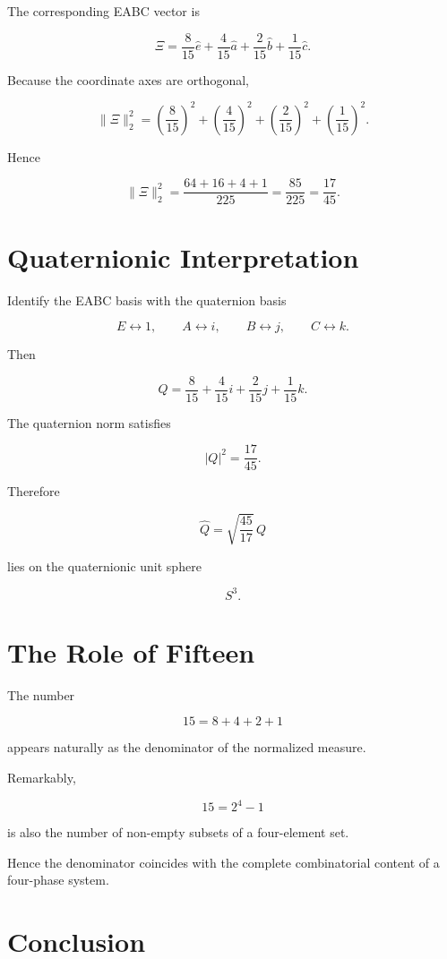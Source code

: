 \documentclass[11pt]{article}
\begin{document}
	The corresponding EABC vector is
	
	\[
	\Xi
	=
	\frac8{15}\hat e
	+
	\frac4{15}\hat a
	+
	\frac2{15}\hat b
	+
	\frac1{15}\hat c.
	\]
	
	Because the coordinate axes are orthogonal,
	
	\[
	\|\Xi\|_2^2
	=
	\left(\frac8{15}\right)^2
	+
	\left(\frac4{15}\right)^2
	+
	\left(\frac2{15}\right)^2
	+
	\left(\frac1{15}\right)^2.
	\]
	
	Hence
	
	\[
	\|\Xi\|_2^2
	=
	\frac{64+16+4+1}{225}
	=
	\frac{85}{225}
	=
	\frac{17}{45}.
	\]
	
	\section{Quaternionic Interpretation}
	
	Identify the EABC basis with the quaternion basis
	
	\[
	E\leftrightarrow1,
	\qquad
	A\leftrightarrow i,
	\qquad
	B\leftrightarrow j,
	\qquad
	C\leftrightarrow k.
	\]
	
	Then
	
	\[
	Q
	=
	\frac8{15}
	+
	\frac4{15}i
	+
	\frac2{15}j
	+
	\frac1{15}k.
	\]
	
	The quaternion norm satisfies
	
	\[
	|Q|^2
	=
	\frac{17}{45}.
	\]
	
	Therefore
	
	\[
	\widehat Q
	=
	\sqrt{\frac{45}{17}}\,Q
	\]
	
	lies on the quaternionic unit sphere
	
	\[
	S^3.
	\]
	
	\section{The Role of Fifteen}
	
	The number
	
	\[
	15=8+4+2+1
	\]
	
	appears naturally as the denominator of the normalized measure.
	
	Remarkably,
	
	\[
	15=2^4-1
	\]
	
	is also the number of non-empty subsets of a four-element set.
	
	Hence the denominator coincides with the complete combinatorial content
	of a four-phase system.
	
	\section{Conclusion}
	
\end{document}

